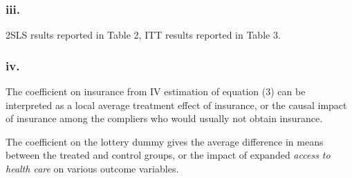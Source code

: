 \documentclass[
]{article}
\newenvironment{Shaded}{\begin{snugshade}}{\end{snugshade}}
\newcommand{\CommentTok}[1]{\textcolor[rgb]{0.56,0.35,0.01}{\textit{#1}}}
\newcommand{\DataTypeTok}[1]{\textcolor[rgb]{0.13,0.29,0.53}{#1}}
\newcommand{\KeywordTok}[1]{\textcolor[rgb]{0.13,0.29,0.53}{\textbf{#1}}}
\newcommand{\NormalTok}[1]{#1}
\newcommand{\OperatorTok}[1]{\textcolor[rgb]{0.81,0.36,0.00}{\textbf{#1}}}
\newcommand{\StringTok}[1]{\textcolor[rgb]{0.31,0.60,0.02}{#1}}
\begin{document}
\begin{Shaded}
\end{Shaded}

\hypertarget{iii.}{%
\subsubsection{iii.}\label{iii.}}

2SLS rsults reported in Table 2, ITT results reported in Table 3.

\hypertarget{iv.}{%
\subsubsection{iv.}\label{iv.}}

The coefficient on insurance from IV estimation of equation (3) can be
interpreted as a local average treatment effect of insurance, or the
causal impact of insurance among the compliers who would usually not
obtain insurance.

The coefficient on the lottery dummy gives the average difference in
means between the treated and control groups, or the impact of expanded
\emph{access to health care} on various outcome variables.
\end{document}
